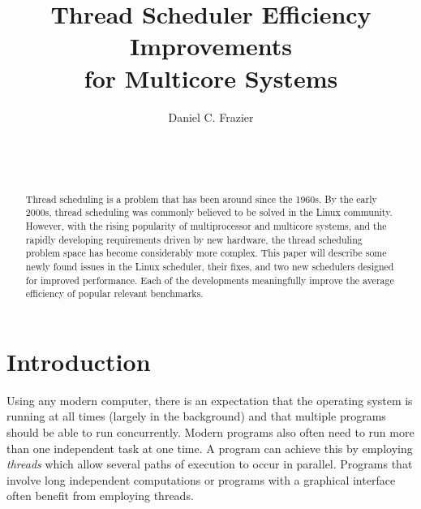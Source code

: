 \documentclass{sig-alternate}
\begin{document}

\title{Thread Scheduler Efficiency Improvements \\ for Multicore Systems}


\author{
\alignauthor
Daniel C. Frazier\\
	\\
	\\
	\\
}
\maketitle

\begin{abstract}

Thread scheduling is a problem that has been around since the 1960s. By the early 2000s, thread scheduling was commonly believed to be solved in the Linux community. However, with the rising popularity of multiprocessor and multicore systems, and the rapidly developing requirements driven by new hardware, the thread scheduling problem space has become considerably more complex. This paper will describe some newly found issues in the Linux scheduler, their fixes, and two new schedulers designed for improved performance. Each of the developments meaningfully improve the average efficiency of popular relevant benchmarks.

\end{abstract}


\section{Introduction}
\label{sec:intro}

Using any modern computer, there is an expectation that the operating system is running at all times (largely in the background) and that multiple programs should be able to run concurrently. Modern programs also often need to run more than one independent task at one time. A program can achieve this by employing \emph{threads} which allow several paths of execution to occur in parallel. Programs that involve long independent computations or programs with a graphical interface often benefit from employing threads.
\end{document}
